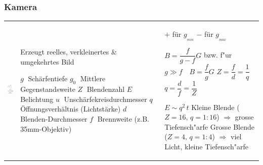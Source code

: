 \subsubsection{Kamera  }
\begin{tabular}{lll}
  \parbox{3cm}{
    \includegraphics[width=3cm]{./bilder/kamera.png}} &
  \parbox{7cm}{
    Erzeugt reelles, verkleinertes \& umgekehrtes Bild \\
    \\
    $g \;$ Schärfentiefe\\
    $g_0 \;$ Mittlere Gegenstandsweite\\
    $Z \;$ Blendenzahl \\
    $E \;$ Belichtung \\
    $u \;$ Unschärfekreisdurchmesser \\
    $q \;$ Öffnungsverhältnis (Lichtstärke) \\
    $d \;$ Blenden-Durchmesser \\
    $f \;$ Brennweite (z.B. 35mm-Objektiv)} &
  \parbox{8cm}{
     \parbox{4cm}{
        $+$ für $g_{_{min}}$\\
        $-$ für $g_{_{max}}$} 
        \\
    $B=\dfrac{f}{g-f}G$ \qquad bzw. f"ur $g\gg f\quad B=\dfrac{f}{g}G$\\
    $Z = \dfrac{f}{d} = \dfrac1q$ \qquad $q = \dfrac{d}{f} = \dfrac1Z$ 
    \\
    $E\sim q^2\,t$ \\
    Kleine Blende ($Z=16, \,q=1:16$)\\ 
    $\Rightarrow$ grosse Tiefensch"arfe\\
    Grosse Blende ($Z=4,\,q=1:4$) \\ 
    $\Rightarrow$ viel Licht, kleine Tiefensch"arfe} \\
\end{tabular}



